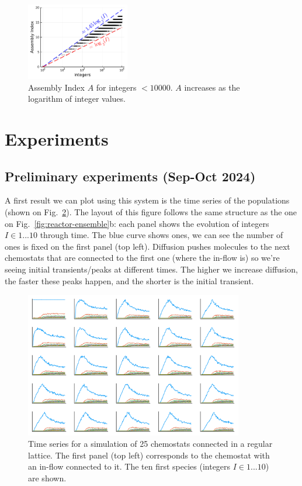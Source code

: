 \documentclass[11pt]{article}
\begin{document}
\begin{figure}[h]
  \centering
  \includegraphics[width=0.40\textwidth]{figures/system/integers-assembly.pdf}
  \caption{Assembly Index $A$ for integers $<10000$. $A$ increases as the logarithm of integer values.}
  \label{fig:integers-assembly}
\end{figure}

\clearpage

\section{Experiments}

\subsection{Preliminary experiments (Sep-Oct 2024)}

A first result we can plot using this system is the time series of the populations (shown on Fig.~\ref{fig:time-series}). The layout of this figure follows the same structure as the one on Fig.~\ref{fig:reactor-ensemble}b: each panel shows the evolution of integers $I\in{1...10}$ through time. The blue curve shows ones, we can see the number of ones is fixed on the first panel (top left). Diffusion pushes molecules to the next chemostats that are connected to the first one (where the in-flow is) so we’re seeing initial transients/peaks at different times. The higher we increase diffusion, the faster these peaks happen, and the shorter is the initial transient.

\begin{figure}[h]
  \centering
  \includegraphics[width=0.85\textwidth]{figures/results/1-prelim/ts-gridplot.pdf}
  \caption{Time series for a simulation of 25 chemostats connected in a regular lattice. The first panel (top left) corresponds to the chemostat with an in-flow connected to it. The ten first species (integers $I\in{1...10}$) are shown.}
  \label{fig:time-series}
\end{figure}
\end{document}

